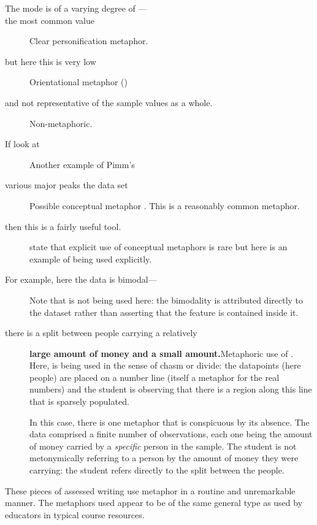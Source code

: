 \begin{description}
\item[The mode is of a varying degree of
  ---]\qquad {}
\item[ the most common value]\qquad Clear
  personification metaphor.
\item[but here this is very low]\qquad Orientational metaphor
  ()
\item[and not representative of the sample values as a whole.]\qquad
  Non-metaphoric.
\item[If  look at]\qquad Another example of Pimm's
  \item[various major peaks  the data set] Possible
    conceptual metaphor .  This is a reasonably common metaphor.
\item[then this is a fairly useful tool.]\qquad{}
  state that explicit use of conceptual metaphors is rare but here is
  an example of  being used explicitly.
\item[For example, here the data is bimodal---]\qquad Note that
  is not being used here: the bimodality is attributed directly to the
  dataset rather than asserting that the feature is contained inside
  it.
\item[there is a split between people carrying a relatively]{\bf large
  amount of money and a small amount.}\qquad Metaphoric use of
  .  Here,  is being used in the sense
  of chasm or divide: the datapoints (here people) are placed on a
  number line (itself a metaphor for the real numbers) and the student
  is observing that there is a region along this line that is sparsely
  populated.

  In this case, there is one metaphor that is conspicuous by its
  absence.  The data comprised a finite number of observations, each
  one being the amount of money carried by a \emph{specific} person in
  the sample.  The student is not metonymically referring to a person
  by the amount of money they were carrying: the student refers
  directly to the split between the people.
\end{description}

\noindent These pieces of assessed writing use metaphor in a routine
and unremarkable manner.  The metaphors used appear to be of the same
general type as used by educators in typical course resources.

